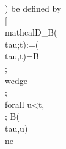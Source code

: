 {{{{{) be defined by\n\\[\n\\mathcal{D}_B(\\tau;t)\n:=\nB(\\tau,t)=B\n\\;\\wedge\\;\n\\forall u<t,\\; B(\\tau,u)\\ne}}}}}
